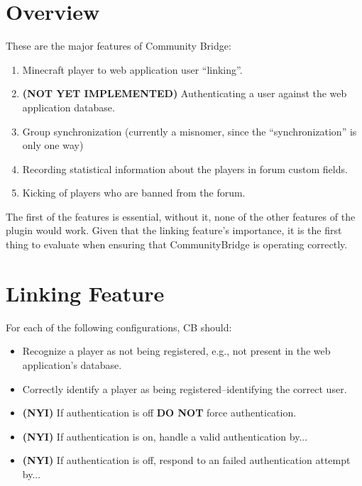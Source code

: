 \documentclass[letterpaper,12pt]{article}
\begin{document}
  \section{Overview}
  These are the major features of Community Bridge:
  \begin{enumerate}
    \item Minecraft player to web application user ``linking''.
    \item {\bf(NOT YET IMPLEMENTED)} Authenticating a user against the web
      application database.
    \item Group synchronization (currently a misnomer, since the
      ``synchronization'' is only one way)
    \item Recording statistical information about the players in forum custom
      fields.
    \item Kicking of players who are banned from the forum.
  \end{enumerate}
  
  The first of the features is essential, without it, none of the other
  features of the plugin would work. Given that the linking feature's
  importance, it is the first thing to evaluate when ensuring that
  CommunityBridge is operating correctly.

  \section{Linking Feature}
  For each of the following configurations, CB should:
  \begin{itemize}
    \item Recognize a player as not being registered, e.g., not present in the
    web application's database.
    \item Correctly identify a player as being registered--identifying the
    correct user.
    \item {\bf (NYI)} If authentication is off {\bf DO NOT} force authentication.
    \item {\bf (NYI)} If authentication is on, handle a valid authentication by...
    \item {\bf (NYI)} If authentication is off, respond to an failed authentication attempt by...
  \end{itemize}
\end{document}
